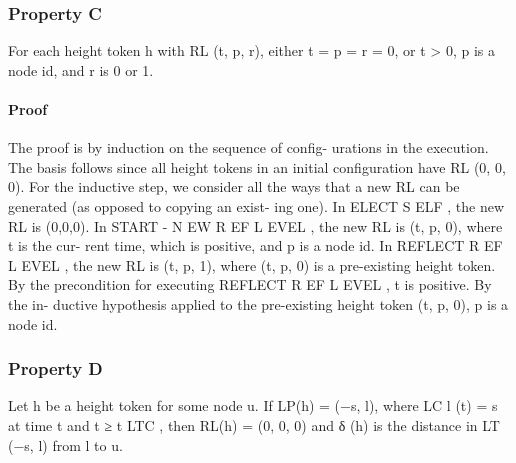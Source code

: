 \documentclass{article}
\begin{document}
\subsubsection{Property C} For each height token h with RL (t, p, r), either
t = p = r = 0, or t > 0, p is a node id, and r is 0 or 1.
\paragraph{Proof}
The proof is by induction on the sequence of config-
urations in the execution. The basis follows since all height
tokens in an initial configuration have RL (0, 0, 0).
For the inductive step, we consider all the ways that a
new RL can be generated (as opposed to copying an exist-
ing one). In ELECT S ELF , the new RL is (0,0,0). In START -
N EW R EF L EVEL , the new RL is (t, p, 0), where t is the cur-
rent time, which is positive, and p is a node id.
In REFLECT R EF L EVEL , the new RL is (t, p, 1), where
(t, p, 0) is a pre-existing height token. By the precondition
for executing REFLECT R EF L EVEL , t is positive. By the in-
ductive hypothesis applied to the pre-existing height token
(t, p, 0), p is a node id.

\subsubsection{Property D} Let h be a height token for some node u. If
LP(h) = (−s, l), where LC l (t) = s at time t and t ≥ t LTC ,
then RL(h) = (0, 0, 0) and δ (h) is the distance in LT (−s, l)
from l to u.
\end{document}
